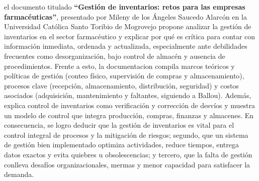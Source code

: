 \documentclass[12pt]{article} %
\begin{document}
el documento titulado \textbf{“Gestión de inventarios: retos para las empresas farmacéuticas”}, presentado por Mileny de los Ángeles Saucedo Alarcón en la Universidad Católica Santo Toribio de Mogrovejo propone analizar la gestión de inventarios en el sector farmacéutico y explicar por qué es crítica para contar con información inmediata, ordenada y actualizada, especialmente ante debilidades frecuentes como desorganización, bajo control de almacén y ausencia de procedimientos. Frente a esto, la documentacion compila marcos teóricos y políticas de gestión (conteo físico, supervisión de compras y almacenamiento), procesos clave (recepción, almacenamiento, distribución, seguridad) y costos asociados (adquisición, mantenimiento y faltantes, siguiendo a Ballou). Además, explica control de inventarios como verificación y corrección de desvíos y muestra un modelo de control que integra producción, compras, finanzas y almacenes. En consecuencia, se logro deducir que la gestión de inventarios es vital para el control integral de procesos y la mitigación de riesgos; segundo, que un sistema de gestión bien implementado optimiza actividades, reduce tiempos, entrega datos exactos y evita quiebres u obsolescencias; y tercero, que la falta de gestión conlleva desafíos organizacionales, mermas y menor capacidad para satisfacer la demanda.
\end{document}
